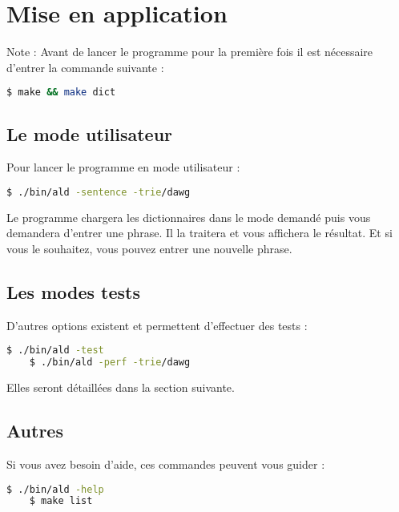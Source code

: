 \chapter{Mise en application}

Note : Avant de lancer le programme pour la première fois il est nécessaire d'entrer la commande suivante :
\begin{lstlisting}[language=bash]
    $ make && make dict
\end{lstlisting}

\section{Le mode utilisateur}

Pour lancer le programme en mode utilisateur :
\begin{lstlisting}[language=bash]
    $ ./bin/ald -sentence -trie/dawg
\end{lstlisting}

Le programme chargera les dictionnaires dans le mode demandé puis vous demandera d'entrer une phrase. Il la traitera et vous affichera le résultat. 
\newline Et si vous le souhaitez, vous pouvez entrer une nouvelle phrase.

\section{Les modes tests}

D'autres options existent et permettent d'effectuer des tests :
\begin{lstlisting}[language=bash]
    $ ./bin/ald -test
    $ ./bin/ald -perf -trie/dawg
\end{lstlisting}

Elles seront détaillées dans la section suivante.

\section{Autres}

Si vous avez besoin d'aide, ces commandes peuvent vous guider :
\begin{lstlisting}[language=bash]
    $ ./bin/ald -help
    $ make list
\end{lstlisting}
